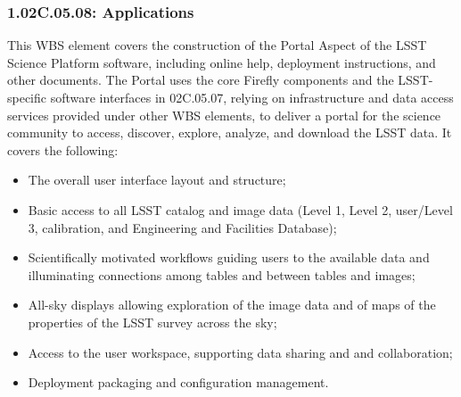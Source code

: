 \subsubsection{1.02C.05.08: Applications}

This WBS element covers the construction of the Portal Aspect of the LSST Science Platform software, including online help, deployment instructions, and other documents. The Portal uses the core Firefly components and the LSST-specific software interfaces in 02C.05.07, relying on infrastructure and data access services provided under other WBS elements, to deliver a portal for the science community to access, discover, explore, analyze, and download the LSST data. It covers the following:
\begin{itemize}

\item{The overall user interface layout and structure;}
\item{Basic access to all LSST catalog and image data (Level 1, Level 2, user/Level 3, calibration, and Engineering and Facilities Database);}
\item{Scientifically motivated workflows guiding users to the available data and illuminating connections among tables and between tables and images;}
\item{All-sky displays allowing exploration of the image data and of maps of the properties of the LSST survey across the sky;}
\item{Access to the user workspace, supporting data sharing and and collaboration;}
\item{Deployment packaging and configuration management.}

\end{itemize}

